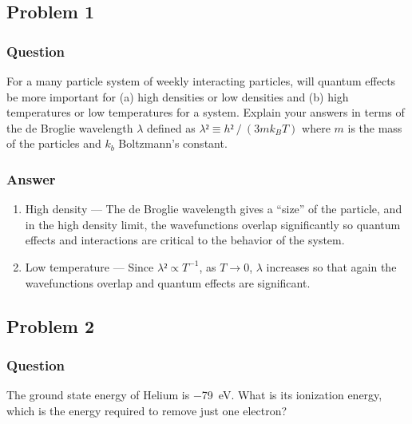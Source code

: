 \subsection{Problem 1}
\subsubsection{Question}

For a many particle system of weekly interacting particles, will quantum 
effects be more important for (a) high densities or low densities and (b) 
high temperatures or low temperatures for a system. Explain your answers in 
terms of the de Broglie wavelength $λ$ defined as $λ² ≡ h²⁄(3mk_BT)$ where 
$m$ is the mass of the particles and $k_b$ Boltzmann's constant.

\subsubsection{Answer}
\renewcommand{\labelenumi}{(\alph{enumi})}
\begin{enumerate}
	\item
		High density — The de Broglie wavelength gives a ``size'' of the 
		particle, and in the high density limit, the wavefunctions overlap 
		significantly so quantum effects and interactions are critical to 
		the behavior of the system.
	\item
		Low temperature — Since $λ² \propto T^{-1}$, as $T → 0$, $λ$ increases
		so that again the wavefunctions overlap and quantum effects are
		significant.
\end{enumerate}

\clearpage
\subsection{Problem 2}
\subsubsection{Question}

The ground state energy of Helium is \SI{-79}{\eV}. What is its ionization
energy, which is the energy required to remove just one electron?

